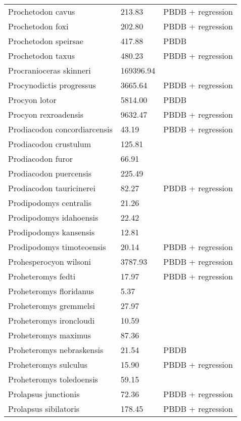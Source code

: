 \documentclass{article}
\begin{document}
\begin{center}
\begin{longtable}{p{} p{} p{} }
  Prochetodon cavus & 213.83 & PBDB + regression \\ 
  Prochetodon foxi & 202.80 & PBDB + regression \\ 
  Prochetodon speirsae & 417.88 & PBDB \\ 
  Prochetodon taxus & 480.23 & PBDB + regression \\ 
  Procranioceras skinneri & 169396.94 & \cite{Tomiya2013} \\ 
  Procynodictis progressus & 3665.64 & PBDB + regression \\ 
  Procyon lotor & 5814.00 & PBDB \\ 
  Procyon rexroadensis & 9632.47 & PBDB + regression \\ 
  Prodiacodon concordiarcensis & 43.19 & PBDB + regression \\ 
  Prodiacodon crustulum & 125.81 & \cite{Lim2001} \\ 
  Prodiacodon furor & 66.91 & \cite{Scott1937} \\ 
  Prodiacodon puercensis & 225.49 & \cite{Mellett1969} \\ 
  Prodiacodon tauricinerei & 82.27 & PBDB + regression \\ 
  Prodipodomys centralis & 21.26 & \cite{Becker1981} \\ 
  Prodipodomys idahoensis & 22.42 & \cite{Tomiya2013} \\ 
  Prodipodomys kansensis & 12.81 & \cite{Tomiya2013} \\ 
  Prodipodomys timoteoensis & 20.14 & PBDB + regression \\ 
  Prohesperocyon wilsoni & 3787.93 & PBDB + regression \\ 
  Proheteromys fedti & 17.97 & PBDB + regression \\ 
  Proheteromys floridanus & 5.37 & \cite{Tomiya2013} \\ 
  Proheteromys gremmelsi & 27.97 & \cite{Becker1981} \\ 
  Proheteromys ironcloudi & 10.59 & \cite{Tomiya2013} \\ 
  Proheteromys maximus & 87.36 & \cite{Tomiya2013} \\ 
  Proheteromys nebraskensis & 21.54 & PBDB \\ 
  Proheteromys sulculus & 15.90 & PBDB + regression \\ 
  Proheteromys toledoensis & 59.15 & \cite{Tomiya2013} \\ 
  Prolapsus junctionis & 72.36 & PBDB + regression \\ 
  Prolapsus sibilatoris & 178.45 & PBDB + regression \\ 

\end{longtable}
\end{center}
\end{document}
